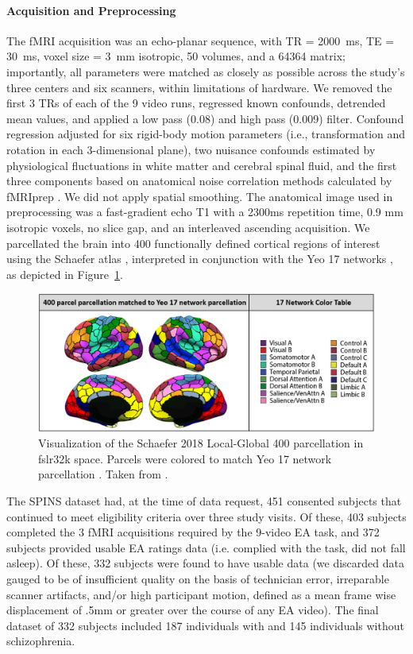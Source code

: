 \paragraph{Acquisition and Preprocessing}
The fMRI acquisition was an echo-planar sequence, with TR = 2000~ms, TE = 30~ms, voxel size = 3~mm isotropic, 50 volumes, and a 64364 matrix; importantly, all parameters were matched as closely as possible across the study’s three centers and six scanners, within limitations of hardware. We removed the first 3 TRs of each of the 9 video runs, regressed known confounds, detrended mean values, and applied a low pass (0.08) and high pass (0.009) filter. Confound regression adjusted for six rigid-body motion parameters (i.e., transformation and rotation in each 3-dimensional plane), two nuisance confounds estimated by physiological fluctuations in white matter and cerebral spinal fluid, and the first three components based on anatomical noise correlation methods calculated by fMRIprep \cite{fmriprep}. We did not apply spatial smoothing. The anatomical image used in preprocessing was a fast-gradient echo T1 with a 2300ms repetition time, 0.9 mm isotropic voxels, no slice gap, and an interleaved ascending acquisition. We parcellated the brain into 400 functionally defined cortical regions of interest using the Schaefer atlas \cite{schaefer2018local}, interpreted in conjunction with the Yeo 17 networks \cite{yeo}, as depicted in Figure~\ref{ch1:fig:schaefer}.

\begin{figure}[h]
    \centering
    \includegraphics[width=0.65\linewidth]{figs/ch1/Schaefer2018_400.png}
    \caption{Visualization of the Schaefer 2018 Local-Global 400 parcellation in fslr32k space. Parcels were colored to match Yeo 17 network parcellation \cite{yeo}. Taken from \cite{schaefer2018local}.}\label{ch1:fig:schaefer}
\end{figure}

The SPINS dataset had, at the time of data request, 451 consented subjects that continued to meet eligibility criteria over three study visits. Of these, 403  subjects completed the 3 fMRI acquisitions required by the 9-video EA task, and 372 subjects provided usable EA ratings data (i.e. complied with the task, did not fall asleep). Of these, 332 subjects were found to have usable data (we discarded data gauged to be of insufficient quality on the basis of technician error, irreparable scanner artifacts, and/or high participant motion, defined as a mean frame wise displacement of .5mm or greater over the course of any EA video). The final dataset of 332 subjects included 187 individuals with and 145 individuals without schizophrenia.

